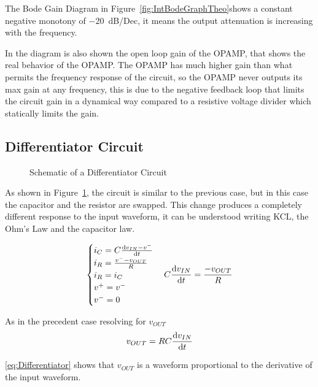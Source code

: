 \documentclass[a4paper, twocolumn]{article}
\begin{document}
The Bode Gain Diagram in Figure~\ref{fig:IntBodeGraphTheo}shows a constant negative monotony of \SI{-20}{\deci\bel/Dec}, it means the output attenuation is increasing with the frequency.

In the diagram is also shown the open loop gain of the OPAMP, that shows the real behavior of the OPAMP. The OPAMP has much higher gain than what permits the frequency response of the circuit, so the OPAMP never outputs its max gain at any frequency, this is due to the negative feedback loop that limits the circuit gain in a dynamical way compared to a resistive voltage divider which statically limits the gain.

\subsection{Differentiator Circuit} 
\label{sec:diff}

\begin{figure}
    \centering
    \def \svgwidht{\columnwidth}
    
    \caption{Schematic of a Differentiator Circuit}
    \label{fig:DifferScheme}
\end{figure}

As shown in Figure~\ref{fig:DifferScheme}, the circuit is similar to the previous case, but in this case the capacitor and the resistor are swapped. This change produces a completely different response to the input waveform, it can be understood writing KCL, the Ohm's Law and the capacitor law.

\begin{gather*}
    \begin{cases}
        i_C = C\dv{v_{IN}-v^-}{t}\\
        i_R = \frac{v^--v_{OUT}}{R}\\
        i_R = i_C\\
        v^+=v^-\\
        v^-=0
    \end{cases}
    C\dv{v_{IN}}{t}=\frac{-v_{OUT}}{R}
\end{gather*}

As in the precedent case resolving for $v_{OUT}$
\begin{equation}
    \label{eq:Differentiator}
    v_{OUT}=RC\dv{v_{IN}}{t}
\end{equation}

\eqref{eq:Differentiator} shows that $v_{OUT}$ is a waveform proportional to the derivative of the input waveform. 
\end{document}
